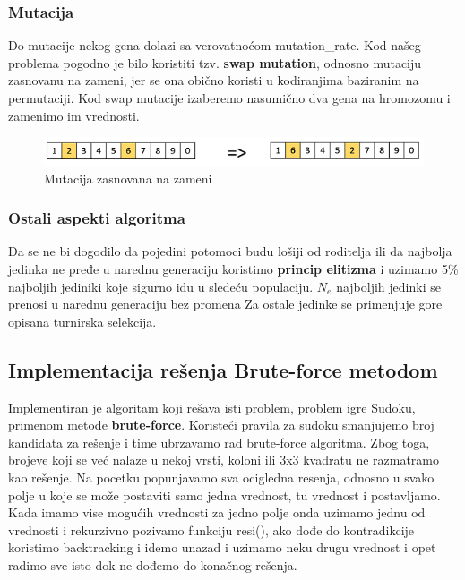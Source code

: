 \documentclass[a4paper]{article}
\begin{document}
\subsubsection{Mutacija}
Do mutacije nekog gena dolazi sa verovatnoćom mutation\_rate. Kod našeg problema pogodno je bilo koristiti tzv. \textbf{swap mutation}, odnosno mutaciju zasnovanu na zameni, jer se ona obično koristi u kodiranjima baziranim na permutaciji. Kod swap mutacije izaberemo nasumično dva gena na hromozomu i zamenimo im vrednosti. 

\begin{figure}[h]
    \centering
    \includegraphics[scale=0.5]{swap_mutation (1).jpg}
    \caption{Mutacija zasnovana na zameni}
    \label{fig:swap}
\end{figure}
\subsubsection{Ostali aspekti algoritma}
Da se ne bi dogodilo da  pojedini potomoci budu lošiji od roditelja ili da najbolja jedinka ne pređe u narednu generaciju koristimo \textbf{princip elitizma} i uzimamo 5\% najboljih jediniki koje sigurno idu u sledeću populaciju. $N_e$ najboljih jedinki se prenosi u narednu generaciju bez promena Za ostale jedinke se primenjuje gore opisana turnirska selekcija.
\subsection{Implementacija rešenja Brute-force metodom}
Implementiran je algoritam koji rešava isti problem, problem igre Sudoku, primenom metode \textbf{brute-force}. Koristeći pravila za sudoku smanjujemo broj kandidata za rešenje i time ubrzavamo rad brute-force algoritma. Zbog toga, brojeve koji se već nalaze u nekoj vrsti, koloni ili 3x3 kvadratu ne razmatramo kao rešenje. Na pocetku popunjavamo sva ocigledna resenja, odnosno u svako polje u koje se može postaviti samo jedna vrednost, tu vrednost i postavljamo. Kada imamo vise mogućih vrednosti za jedno polje onda uzimamo jednu od vrednosti i rekurzivno pozivamo funkciju resi(), ako dođe do kontradikcije koristimo backtracking i idemo unazad i uzimamo neku drugu vrednost i opet radimo sve isto dok ne dođemo do konačnog rešenja.




\appendix
 

\end{document}
